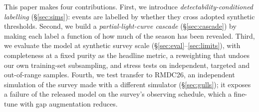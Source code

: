 \documentclass[twocolumn,linenumbers,floatfix,twocolappendix]{aastex701}
\begin{document}
This paper makes four contributions. First, we introduce \emph{detectability-conditioned labelling}
(\S\ref{sec:sims}): events are labelled by whether they cross adopted synthetic thresholds. Second, we build a
\emph{partial-light-curve cascade} (\S\ref{sec:cascade}) by making each label a function of how much of the season
has been revealed. Third, we evaluate the model at synthetic survey scale (\S\ref{sec:eval}--\ref{sec:limits}), with
completeness at a fixed purity as the headline metric, a reweighting that undoes our own training-set subsampling,
and stress tests on independent, targeted and out-of-range samples. Fourth, we test transfer to RMDC26, an
independent simulation of the survey made with a different simulator (\S\ref{sec:gulls}); it exposes a failure of
the released model on the survey's observing schedule, which a fine-tune with gap augmentation reduces.
\end{document}
